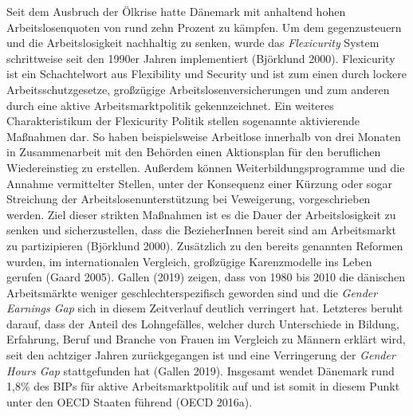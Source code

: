 \documentclass[12pt,]{article}
\begin{document}
Seit dem Ausbruch der Ölkrise hatte Dänemark mit anhaltend hohen
Arbeitslosenquoten von rund zehn Prozent zu kämpfen. Um dem
gegenzusteuern und die Arbeitslosigkeit nachhaltig zu senken, wurde das
\emph{Flexicurity} System schrittweise seit den 1990er Jahren
implementiert (Björklund 2000). Flexicurity ist ein Schachtelwort aus
Flexibility und Security und ist zum einen durch lockere
Arbeitsschutzgesetze, großzügige Arbeitslosenversicherungen und zum
anderen durch eine aktive Arbeitsmarktpolitik gekennzeichnet. Ein
weiteres Charakteristikum der Flexicurity Politik stellen sogenannte
aktivierende Maßnahmen dar. So haben beispielsweise Arbeitlose innerhalb
von drei Monaten in Zusammenarbeit mit den Behörden einen Aktionsplan
für den beruflichen Wiedereinstieg zu erstellen. Außerdem können
Weiterbildungsprogramme und die Annahme vermittelter Stellen, unter der
Konsequenz einer Kürzung oder sogar Streichung der
Arbeitslosenunterstützung bei Veweigerung, vorgeschrieben werden. Ziel
dieser strikten Maßnahmen ist es die Dauer der Arbeitslosigkeit zu
senken und sicherzustellen, dass die BezieherInnen bereit sind am
Arbeitsmarkt zu partizipieren (Björklund 2000). Zusätzlich zu den
bereits genannten Reformen wurden, im internationalen Vergleich,
großzügige Karenzmodelle ins Leben gerufen (Gaard 2005). Gallen (2019)
zeigen, dass von 1980 bis 2010 die dänischen Arbeitsmärkte weniger
geschlechterspezifisch geworden sind und die \emph{Gender Earnings Gap}
sich in diesem Zeitverlauf deutlich verringert hat. Letzteres beruht
darauf, dass der Anteil des Lohngefälles, welcher durch Unterschiede in
Bildung, Erfahrung, Beruf und Branche von Frauen im Vergleich zu Männern
erklärt wird, seit den achtziger Jahren zurückgegangen ist und eine
Verringerung der \emph{Gender Hours Gap} stattgefunden hat (Gallen
2019). Insgesamt wendet Dänemark rund 1,8\% des BIPs für aktive
Arbeitsmarktpolitik auf und ist somit in diesem Punkt unter den OECD
Staaten führend (OECD 2016a).
\end{document}
